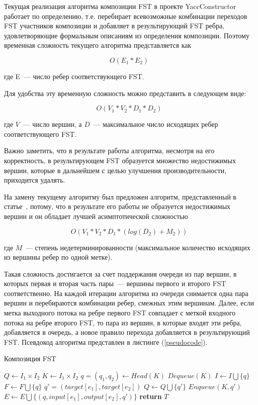 Текущая реализация алгоритма композиции FST в проекте YaccConstructor работает по определению, т.е. перебирает всевозможные комбинации переходов FST участников композиции и добавляет в результирующий FST ребра, удовлетворяющие формальным описаниям из определения композиции. Поэтому временная сложность текущего алгоритма представляется как

$$O(E_1 * E_2)$$

\noindent где E~--- число ребер соответствующего FST.

Для удобства эту временную сложность можно представить в следующем виде:

$$O(V_1 * V_2 * D_1 * D_2)$$

\noindent где $V$~--- число вершин, а $D$~--- максимальное число исходящих ребер соответствующего FST.

Важно заметить, что в результате работы алгоритма, несмотря на его корректность, в результирующем FST образуется множество недостижимых вершин, которые в дальнейшем с целью улучшения производительности, приходится удалять.

На замену текущему алгоритму был предложен алгоритм, представленный в статье~\cite{handbook_automata}, потому, что в результате его работы не образуется недостижимых вершин и он обладает лучшей асимптотической сложностью

$$O(V_1 * V_2 * D_1 * (log(D_2) + M_2))$$

\noindent где $M$~--- степень недетерминированности (максимальное количество исходящих из вершины ребер по одной метке).

Такая сложность достигается за счет поддержания очереди из пар вершин, в которых первая и вторая часть пары~--- вершины первого и второго FST соответственно. На каждой итерации алгоритма из очереди снимается одна пара вершин и перебираются комбинации ребер, смежных этим вершинам. Далее, если метка выходного потока на ребре первого FST совпадает с меткой входного потока на ребре второго FST, то пара из вершин, в которые входят эти ребра, добавляется в очередь, а новое правило перехода добавляется в результирующий FST. Псевдокод алгоритма представлен в листинге (\ref{pseudocode}).

\begin{algorithm}[h]
 \caption{Композиция FST}
 \label{pseudocode}
 \begin{algorithmic}[1]
 \State $Q\gets I_1\times I_2$
 \State $K\gets I_1\times I_2$ 
   \State $q = (q_1, q_2)\gets Head(K)$
   \State $Dequeue(K)$
     \State $I \gets I \bigcup \{q\}$
   \EndIf
     \State $F \gets F \bigcup \{q\}$
   \EndIf
     \State $q' = (target[e_1], target[e_2])$
       \State $Q\gets Q \bigcup \{q'\}$
       \State $Enqueue(K, q')$
     \EndIf
     \State $E\gets E \bigcup \{(q, input[e_1], output[e_2], q')\}$
   \EndFor
 \EndWhile  
 \State \textbf{return} $T$
 \EndFunction
\end{algorithmic}
\end{algorithm}


